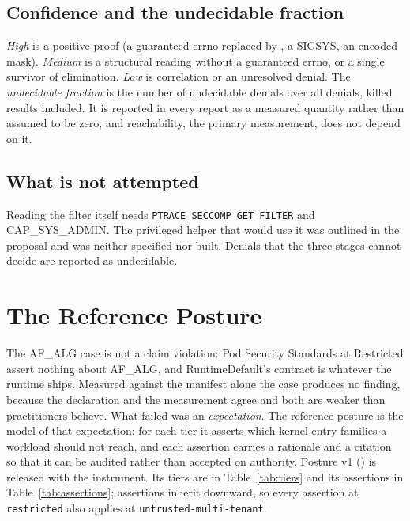 \subsection{Confidence and the undecidable fraction}
\emph{High} is a positive proof (a guaranteed errno replaced by , a SIGSYS, an encoded mask). \emph{Medium} is a structural reading without a guaranteed errno, or a single survivor of elimination. \emph{Low} is correlation or an unresolved denial. The \emph{undecidable fraction} is the number of undecidable denials over all denials, killed results included. It is reported in every report as a measured quantity rather than assumed to be zero, and reachability, the primary measurement, does not depend on it.

\subsection{What is not attempted}
Reading the filter itself needs \texttt{PTRACE\_SECCOMP\_GET\_FILTER} and CAP\_SYS\_ADMIN. The privileged helper that would use it was outlined in the proposal and was neither specified nor built. Denials that the three stages cannot decide are reported as undecidable.

\section{The Reference Posture}
\label{sec:posture}

The AF\_ALG case is not a claim violation: Pod Security Standards at Restricted assert nothing about AF\_ALG, and RuntimeDefault's contract is whatever the runtime ships. Measured against the manifest alone the case produces no finding, because the declaration and the measurement agree and both are weaker than practitioners believe. What failed was an \emph{expectation}. The reference posture is the model of that expectation: for each tier it asserts which kernel entry families a workload should not reach, and each assertion carries a rationale and a citation so that it can be audited rather than accepted on authority. Posture v1 () is released with the instrument. Its tiers are in Table~\ref{tab:tiers} and its assertions in Table~\ref{tab:assertions}; assertions inherit downward, so every assertion at \texttt{restricted} also applies at \texttt{untrusted-multi-tenant}.

